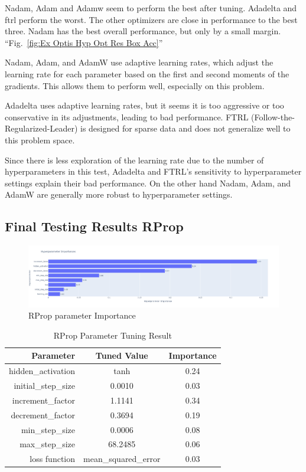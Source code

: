 \documentclass[conference]{IEEEtran}
\begin{document}
\FloatBarrier

Nadam, Adam and Adamw seem to perform the best after tuning. Adadelta and ftrl perform the worst. The other optimizers are close in performance to the best three.
Nadam has the best overall performance, but only by a small margin. ``Fig.~\ref{fig:Ex Optis Hyp Opt Res Box Acc}''

Nadam, Adam, and AdamW use adaptive learning rates, which adjust the learning rate for each parameter based on the first and second moments of the gradients. This allows them to perform well, especially on this problem.

Adadelta uses adaptive learning rates, but it seems it is too aggressive or too conservative in its adjustments, leading to bad performance. FTRL (Follow-the-Regularized-Leader) is designed for sparse data and does not generalize well to this problem space.

Since there is less exploration of the learning rate due to the number of hyperparameters in this test, Adadelta and FTRL's sensitivity to hyperparameter settings \cite{b5} explain their bad performance. On the other hand Nadam, Adam, and AdamW are generally more robust to hyperparameter settings. \cite{b4} 

\subsection{Final Testing Results RProp}

\begin{figure}[htbp]
\centerline{\includegraphics[width=\columnwidth]{F RProp Hyp Opt Res Imp.png}}
\caption{RProp parameter Importance}
\label{fig:F RProp Hyp Opt Res Imp}
\end{figure}

\FloatBarrier

\begin{table}[htbp]
    \centering
    \begin{tabular}{|r|c|c|}\hline
 Parameter& Tuned Value&Importance\\\hline
        \hline
        hidden\_activation& tanh&0.24\\ \hline
        initial\_step\_size& 0.0010&0.03\\ \hline
        increment\_factor& 1.1141&0.34\\ \hline
        decrement\_factor& 0.3694&0.19\\ \hline
         min\_step\_size& 0.0006&0.08\\ \hline
        max\_step\_size& 68.2485&0.06\\ \hline
        loss function & mean\_squared\_error&0.03\\\hline
    \end{tabular}
    \caption{RProp Parameter Tuning Result}
    \label{tab:RPropFinalParams}
\end{table}
\end{document}
